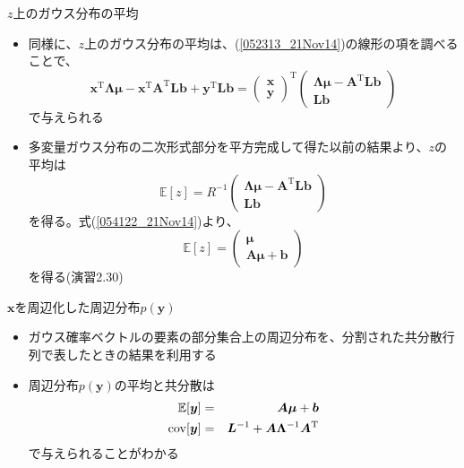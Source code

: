 \begin{frame}{$z$上のガウス分布の平均}
 \begin{itemize}
  \item 同様に、$z$上のガウス分布の平均は、(\ref{052313_21Nov14})の線形の項を調べることで、
        \begin{equation}
         \bm{x}^{\mathrm{T}}\bm{\Lambda}\bm{\mu}-\bm{x}^{\mathrm{T}}\bm{A}^{\mathrm{T}}\bm{L}\bm{b}+\bm{y}^{\mathrm{T}}\bm{L}\bm{b} =
          \begin{pmatrix}
           \bm{x} \\
           \bm{y}
          \end{pmatrix}^{\mathrm{T}}
          \begin{pmatrix}
           \bm{\Lambda}\bm{\mu}-\bm{A}^{\mathrm{T}}\bm{L}\bm{b} \\
           \bm{L}\bm{b}
          \end{pmatrix}
        \end{equation}
        で与えられる
  \item 多変量ガウス分布の二次形式部分を平方完成して得た以前の結果より、$z$の平均は
        \begin{equation}
         \mathbb{E}[z]=R^{-1}
          \begin{pmatrix}
           \bm{\Lambda}\bm{\mu}-\bm{A}^{\mathrm{T}}\bm{L}\bm{b} \\
           \bm{L}\bm{b}
          \end{pmatrix}
        \end{equation}
        を得る。式(\ref{054122_21Nov14})より、
        \begin{equation}
         \mathbb{E}[z]=
          \begin{pmatrix}
           \bm{\mu} \\
           \bm{A}\bm{\mu} + \bm{b}
          \end{pmatrix}
        \end{equation}
        を得る(演習2.30)
 \end{itemize}
\end{frame}

\begin{frame}{$\bm{x}$を周辺化した周辺分布$p(\bm{y})$}
 \begin{itemize}
  \item ガウス確率ベクトルの要素の部分集合上の周辺分布を、分割された共分散行列で表したときの結果を利用する
  \item 周辺分布$p(\bm{y})$の平均と共分散は
        \begin{eqnarray}
         \mathbb{E}[\bm{y}] &= &\bm{A}\bm{\mu} +\bm{b}\\
         {\rm cov}[\bm{y}] &=& \bm{L}^{-1} + \bm{A}\bm{\Lambda}^{-1}\bm{A}^{\mathrm{T}}
        \end{eqnarray}
        で与えられることがわかる
 \end{itemize}
\end{frame}


